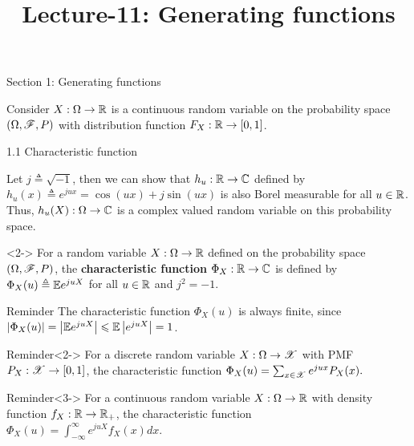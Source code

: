 \documentclass[12pt,aspectratio=169]{beamer}
\title{Lecture-11: Generating functions}
\date{}
\begin{document}
\pagestyle{empty}
\maketitle

\begin{frame}{Section 1: Generating functions}

Consider $X:\Omega \to \mathbb{R}$ is a continuous random variable on the probability space $(\Omega,\mathscr{F}, P)$ with distribution function $F_X: \mathbb{R} \to [0,1]$. 

\end{frame}

\begin{frame}{1.1 Characteristic function}
\begin{Example} 
Let $j \triangleq \sqrt{-1}$, 
then we can show that $h_u: \mathbb{R} \to \mathbb{C}$ defined by $h_u(x) \triangleq e^{ju x} = \cos(u x) + j \sin(u x)$ is also Borel measurable for all $u \in \mathbb{R}$.  
Thus, $h_u(X):\Omega \to \mathbb{C}$ is a complex valued random variable on this probability space.  
\end{Example}

\begin{Definition}<2->
For a random variable $X: \Omega \to \mathbb{R}$ defined on the probability space $(\Omega, \mathscr{F}, P)$, 
the \textbf{characteristic function} $\Phi_X: \mathbb{R} \to \mathbb{C}$ is defined by $\Phi_X(u) \triangleq \mathbb{E} e^{j u X}$ for all $u \in \mathbb{R}$ and $j^2 = -1$. 
\end{Definition}

\end{frame}

\begin{frame}

\begin{block}{Reminder}
The characteristic function $\Phi_X(u)$ is always finite, 
since $\left\lvert\Phi_X(u)\right\rvert = \left\lvert\mathbb{E} e^{ju X}\right\rvert \leqslant \mathbb{E}\left\lvert e^{ju X}\right\rvert = 1$. 
\end{block} 
\begin{block}{Reminder}<2->
For a discrete random variable $X: \Omega \to \mathscr{X}$ with PMF $P_X:\mathscr{X}\to [0,1]$, 
the characteristic function $\Phi_X(u) %
= \sum_{x \in \sX}e^{ju x}P_X(x).$
\end{block} 
\begin{block}{Reminder}<3->
For a continuous random variable $X: \Omega \to \mathbb{R}$ with density function $f_X: \mathbb{R} \to \mathbb{R}_+$, 
the characteristic function $\Phi_X(u) = \int_{-\infty}^{\infty}e^{ju X}f_X(x)dx.$
\end{block} 
\end{frame}
\end{document}
